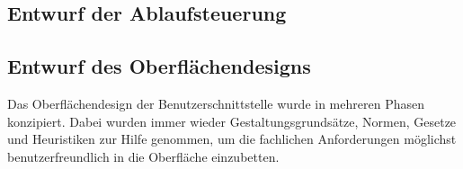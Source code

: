 \subsection{Entwurf der Ablaufsteuerung}

\subsection{Entwurf des Oberflächendesigns}
Das Oberflächendesign der Benutzerschnittstelle wurde in mehreren Phasen konzipiert. Dabei wurden immer wieder Gestaltungsgrundsätze, Normen, Gesetze und Heuristiken zur Hilfe genommen, um die fachlichen Anforderungen möglichst benutzerfreundlich in die Oberfläche einzubetten.

